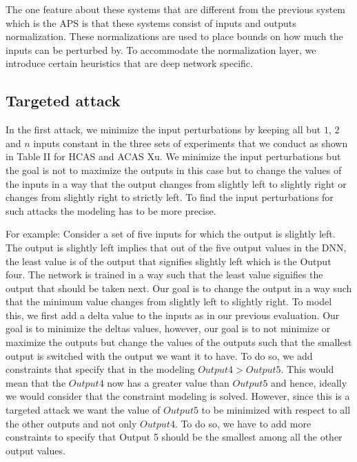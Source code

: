The one feature about these systems that are different from the previous system which is the APS is that these systems consist of inputs and outputs normalization. These normalizations are used to place bounds on how much the inputs can be perturbed by. To accommodate the normalization layer, we introduce certain heuristics that are deep network specific. %

\subsection{Targeted attack} 
In the first attack, we minimize the input perturbations by keeping all but $1$, $2$ and $n$ inputs constant in the three sets of experiments that we conduct as shown in Table II for HCAS and ACAS Xu. We minimize the input perturbations but the goal is not to maximize the outputs in this case but to change the values of the inputs in a way that the output changes from slightly left to slightly right or changes from slightly right to strictly left. To find the input perturbations for such attacks the modeling has to be more precise.

For example: Consider a set of five inputs for which the output is slightly left. The output is slightly left implies that out of the five output values in the DNN, the least value is of the output that signifies slightly left which is the Output four. The network is trained in a way such that the least value signifies the output that should be taken next. Our goal is to change the output in a way such that the minimum value changes from slightly left to slightly right. To model this, we first add a delta value to the inputs as in our previous evaluation. Our goal is to minimize the deltas values, however, our goal is to not minimize or maximize the outputs but change the values of the outputs such that the smallest output is switched with the output we want it to have. To do so, we add constraints that specify that in the modeling $Output 4 > Output 5$. This would mean that the $Output 4$ now has a greater value than $Output 5$ and hence, ideally we would consider that the constraint modeling is solved. However, since this is a targeted attack we want the value of $Output 5$ to be minimized with respect to all the other outputs and not only $Output 4$. To do so, we have to add more constraints to specify that Output 5 should be the smallest among all the other output values.

